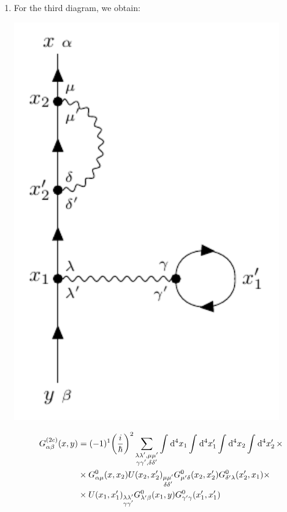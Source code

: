 \documentclass[11pt, a4paper, twoside, openright]{article}
\begin{document}
\begin{enumerate}[label=(\alph*)]
\item For the third diagram, we obtain:

\begin{minipage}[]{0.35\linewidth}
\centering
\includegraphics[width=0.9\textwidth]{images/C_label_c.pdf}
\label{}
\end{minipage}
\begin{minipage}[c]{0.65\linewidth}
\begin{equation}
\begin{split}
  G_{\alpha \beta }^{(2c)} (x,y) &= (-1)^1 \qty(\frac{i}{\hbar })^2
   \sum_{\substack{\lambda \lambda', \mu \mu' \\ \gamma \gamma', \delta \delta'   } }^{} \int_{}^{} \dd[4]{x_1} \int_{}^{} \dd[4]{x_1'} \int_{}^{} \dd[4]{x_2} \int_{}^{} \dd[4]{x_2'} \times \\
  & \times G_{\alpha \mu }^0 (x,x_2) U(x_2,x_2')_{\substack{ \mu \mu' \\ \delta \delta'} } G^0_{\mu' \delta } (x_2,x_2') G^0_{\delta' \lambda } (x_2',x_1) \times \\
  & \times U(x_1,x_1')_{\substack{ \lambda \lambda' \\ \gamma \gamma'} }
  G^0_{\lambda' \beta } (x_1,y) G^0_{\gamma' \gamma } (x_1',x_1')
\end{split}
\label{eq:c_analitic}
\end{equation}
\end{minipage}


\end{enumerate}
\end{document}

